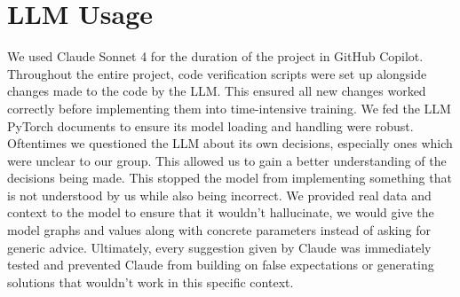 \documentclass[letterpaper,11pt]{article}
\begin{document}
\section{LLM Usage}
We used Claude Sonnet 4 for the duration of the project in GitHub Copilot. Throughout the entire project, code verification scripts were set up alongside changes made to the code by the LLM. This ensured all new changes worked correctly before implementing them into time-intensive training. We fed the LLM PyTorch documents to ensure its model loading and handling were robust. Oftentimes we questioned the LLM about its own decisions, especially ones which were unclear to our group. This allowed us to gain a better understanding of the decisions being made. This stopped the model from implementing something that is not understood by us while also being incorrect. We provided real data and context to the model to ensure that it wouldn't hallucinate, we would give the model graphs and values along with concrete parameters instead of asking for generic advice. Ultimately, every suggestion given by Claude was immediately tested and prevented Claude from building on false expectations or generating solutions that wouldn't work in this specific context.
\end{document}
